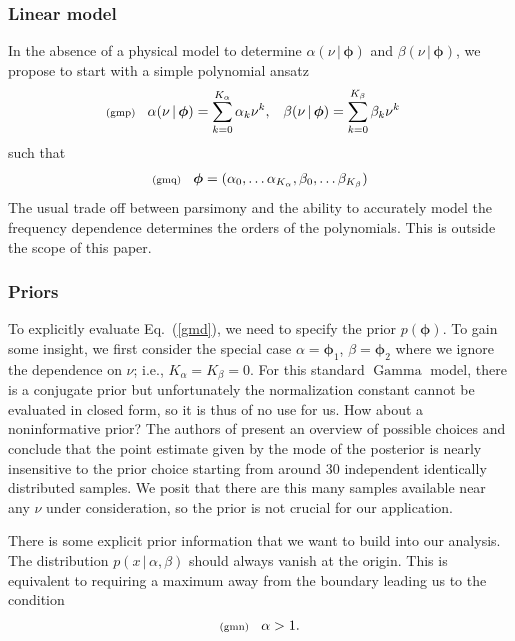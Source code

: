 \documentclass[11pt]{article}
\newcommand{\lleq}[1]{\label{#1} }
\renewcommand{\lleq}[1]{\label{#1} {\scriptstyle {\rm (#1)}} \hspace*{2ex} }
\newcommand{\cond}{\,|\,}
\newcommand{\bmphi}{{\bm{\phi}}}
\newcommand{\refeq}[1]{Eq.~(\ref{#1})}
\DeclareMathOperator{\GammaDist}{Gamma}
\newcommand{\Kalpha}{{K_\alpha}}
\newcommand{\Kbeta}{{K_\beta}}
\begin{document}
\subsubsection*{Linear model}

In the absence of a physical model to determine $\alpha(\nu \cond
\bmphi)$ and $\beta(\nu \cond \bmphi)$, we propose to start with a simple polynomial ansatz
\begin{align}
  \lleq{gmp}
  \alpha(\nu \cond \bmphi) &= \sum_{k=0}^\Kalpha \alpha_k \nu^k,
  &\beta(\nu \cond \bmphi) &= \sum_{k=0}^\Kbeta \beta_k \nu^k
\end{align}
such that
\begin{align}
  \lleq{gmq}
  \bmphi = (\alpha_0, \dots \alpha_\Kalpha , \beta_0, \dots \beta_\Kbeta)
\end{align}
The usual trade off between parsimony and the ability to accurately
model the frequency dependence determines the orders of the
polynomials. This is outside the scope of this paper.

\subsubsection*{Priors} \label{sec:priors}

To explicitly evaluate \refeq{gmd}, we need to specify the prior
$p(\bmphi)$. To gain some insight, we first consider the special case
$\alpha = \bmphi_1$, $\beta = \bmphi_2$ where we ignore the dependence
on $\nu$; i.e., $\Kalpha = \Kbeta = 0$. For this standard $\GammaDist$
model, there is a conjugate prior but unfortunately the normalization
constant cannot be evaluated in closed form, so it is thus of no use
for us. How about a noninformative prior? The authors of
\cite{moala2013bayesian} present an overview of possible choices and
conclude that the point estimate given by the mode of the posterior is
nearly insensitive to the prior choice starting from around 30
independent identically distributed samples. We posit that there are
this many samples available near any $\nu$ under consideration, so the
prior is not crucial for our application.

There is some explicit prior information that we want to build into
our analysis. The distribution $p(x \cond \alpha, \beta)$ should
always vanish at the origin. This is equivalent to requiring a maximum
away from the boundary leading us to the condition
\begin{align}
  \lleq{gmn}
  \alpha > 1.
\end{align}
\end{document}
